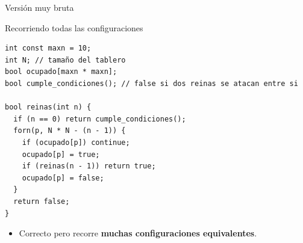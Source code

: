 \documentclass[aspectratio=169]{beamer}
\begin{document}
\begin{frame}[fragile]{Versión muy bruta}
  \begin{block}{Recorriendo todas las configuraciones}
  \begin{lstlisting}[style=customc]
int const maxn = 10;
int N; // tamaño del tablero
bool ocupado[maxn * maxn];
bool cumple_condiciones(); // false si dos reinas se atacan entre si

bool reinas(int n) {
  if (n == 0) return cumple_condiciones();
  forn(p, N * N - (n - 1)) {
    if (ocupado[p]) continue;
    ocupado[p] = true;
    if (reinas(n - 1)) return true;
    ocupado[p] = false;
  }
  return false;
}
  \end{lstlisting}
  \end{block}
  \begin{itemize}
    \item Correcto pero recorre \textbf{muchas configuraciones equivalentes}.
  \end{itemize}
\end{frame}

\end{document}
